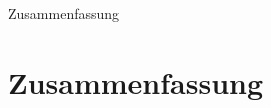 \documentclass{standalone}
\begin{document}
\begin{frame}
  \begin{center}
    Zusammenfassung
  \end{center}
  \section{Zusammenfassung}
\end{frame}



\end{document}
